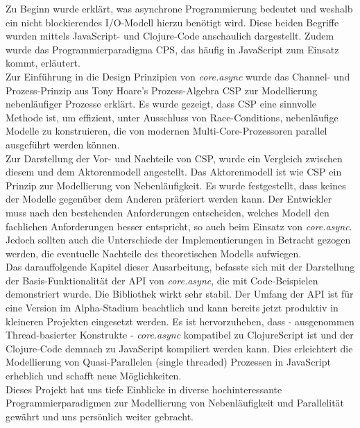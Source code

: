 \documentclass[12pt,a4paper,parskip=half,listof=totoc]{scrreprt}
\begin{document}
Zu Beginn wurde erklärt, was asynchrone Programmierung bedeutet und weshalb ein nicht blockierendes \acs{I/O}-Modell hierzu benötigt wird. Diese beiden Begriffe wurden mittels JavaScript- und Clojure-Code anschaulich dargestellt. Zudem wurde das Programmierparadigma \acf{CPS}, das häufig in JavaScript zum Einsatz kommt, erläutert.\\
Zur Einführung in die Design Prinzipien von \textit{core.async} wurde das Channel- und Prozess-Prinzip aus Tony Hoare's Prozess-Algebra \acf{CSP} zur Modellierung nebenläufiger Prozesse erklärt. Es wurde gezeigt, dass \acs{CSP} eine sinnvolle Methode ist, um effizient, unter Ausschluss von  Race-Conditions, nebenläufige Modelle zu konstruieren, die von modernen Multi-Core-Prozessoren parallel ausgeführt werden können.\\
Zur Darstellung der Vor- und Nachteile von \acs{CSP}, wurde ein Vergleich zwischen diesem und dem Aktorenmodell angestellt. Das Aktorenmodell ist wie \acs{CSP} ein Prinzip zur Modellierung von Nebenläufigkeit. Es wurde festgestellt, dass keines der Modelle gegenüber dem Anderen präferiert werden kann. Der Entwickler muss nach den bestehenden Anforderungen entscheiden, welches Modell den fachlichen Anforderungen besser entspricht, so auch beim Einsatz von \textit{core.async}. Jedoch sollten auch die Unterschiede der Implementierungen in Betracht gezogen werden, die eventuelle Nachteile des theoretischen Modells aufwiegen.\\
Das darauffolgende Kapitel dieser Ausarbeitung, befasste sich mit der Darstellung der Basis-Funktionalität der \acs{API} von \textit{core.async}, die mit Code-Beispielen demonstriert wurde. Die Bibliothek wirkt sehr stabil. Der Umfang der \acs{API} ist für eine Version im Alpha-Stadium beachtlich und kann bereits jetzt produktiv in kleineren Projekten eingesetzt werden. Es ist hervorzuheben, dass - ausgenommen Thread-basierter Konstrukte - \textit{core.async} kompatibel zu ClojureScript ist und der Clojure-Code demnach zu JavaScript kompiliert werden kann. Dies erleichtert die Modellierung von Quasi-Parallelen (single threaded) Prozessen in JavaScript erheblich und schafft neue Möglichkeiten.\\
Dieses Projekt hat uns tiefe Einblicke in diverse hochinteressante Programmierparadigmen zur Modellierung von Nebenläufigkeit und Parallelität gewährt und uns persönlich weiter gebracht.
\end{document}
